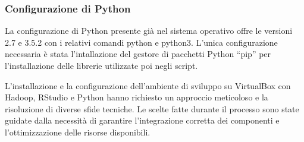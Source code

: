 \subsubsection{Configurazione di Python}
La configurazione di Python presente già nel sistema operativo offre le versioni 2.7 e 3.5.2 con i relativi comandi python e python3. L’unica configurazione necessaria è stata l’intallazione del gestore di pacchetti Python “pip” per l’installazione delle librerie utilizzate poi negli script.

L'installazione e la configurazione dell'ambiente di sviluppo su VirtualBox con Hadoop, RStudio e Python hanno richiesto un approccio meticoloso e la risoluzione di diverse sfide tecniche. Le scelte fatte durante il processo sono state guidate dalla necessità di garantire l'integrazione corretta dei componenti e l'ottimizzazione delle risorse disponibili.



